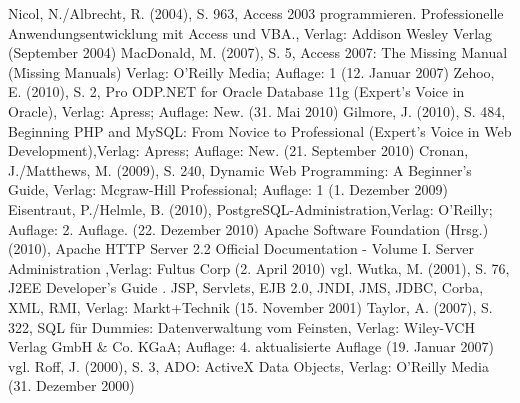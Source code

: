 Nicol, N./Albrecht, R. (2004), S. 963, Access 2003 programmieren. Professionelle Anwendungsentwicklung mit Access und VBA., Verlag: Addison Wesley Verlag (September 2004)
MacDonald, M. (2007), S. 5, Access 2007: The Missing Manual (Missing Manuals) Verlag: O'Reilly Media; Auflage: 1 (12. Januar 2007)
Zehoo, E. (2010), S. 2, Pro ODP.NET for Oracle Database 11g (Expert's Voice in Oracle), Verlag: Apress; Auflage: New. (31. Mai 2010)
Gilmore, J. (2010), S. 484, Beginning PHP and MySQL: From Novice to Professional (Expert's Voice in Web Development),Verlag: Apress; Auflage: New. (21. September 2010)
Cronan, J./Matthews, M. (2009), S. 240, Dynamic Web Programming: A Beginner's Guide, Verlag: Mcgraw-Hill Professional; Auflage: 1 (1. Dezember 2009)
Eisentraut, P./Helmle, B. (2010), PostgreSQL-Administration,Verlag: O'Reilly; Auflage: 2. Auflage. (22. Dezember 2010)
Apache Software Foundation (Hrsg.) (2010), Apache HTTP Server 2.2 Official Documentation - Volume I. Server Administration ,Verlag: Fultus Corp (2. April 2010)
vgl. Wutka, M. (2001), S. 76, J2EE Developer's Guide . JSP, Servlets, EJB 2.0, JNDI, JMS, JDBC, Corba, XML, RMI, Verlag: Markt+Technik (15. November 2001)
Taylor, A. (2007), S. 322, SQL für Dummies: Datenverwaltung vom Feinsten, Verlag: Wiley-VCH Verlag GmbH & Co. KGaA; Auflage: 4. aktualisierte Auflage (19. Januar 2007)
vgl. Roff, J. (2000), S. 3, ADO: ActiveX Data Objects, Verlag: O'Reilly Media (31. Dezember 2000)
